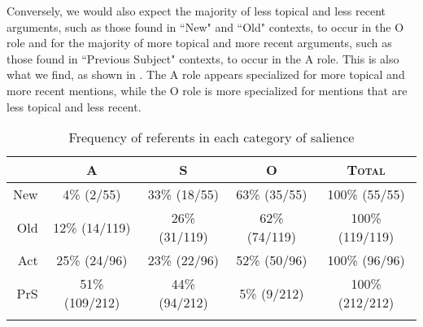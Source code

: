 Conversely, we would also expect the majority of less topical and less recent arguments, such as those found in ``New" and ``Old" contexts, to occur in the O role and for the majority of more topical and more recent arguments, such as those found in ``Previous Subject" contexts, to occur in the A role. This is also what we find, as shown in . The A role  appears specialized for more topical and more recent mentions, while the O role is more specialized for mentions that are less topical and less recent. 
\begin{table}

\caption{{Frequency of referents in each category of salience}}
\begin{tabular}{| r  c  c  c  c }
\lsptoprule
  & \textsc{A} & \textsc{S} & \textsc{O} & \textsc{Total} \\

\midrule
 New & 4{\%} (2/55) & 33{\%} (18/55) & 63{\%} (35/55)  & 100{\%} (55/55) \\

\midrule
  Old & 12{\%} (14/119) & 26{\%} (31/119) & 62{\%} (74/119) & 100{\%} (119/119) \\

\midrule 
  Act & 25{\%} (24/96) & 23{\%} (22/96) & 52{\%} (50/96) & 100{\%} (96/96) \\

\midrule
PrS & 51{\%} (109/212) & 44{\%} (94/212) & 5{\%} (9/212) & 100{\%} (212/212) \\

\lspbottomrule
\end{tabular}\\
\label{totalsalience2}

\end{table}


